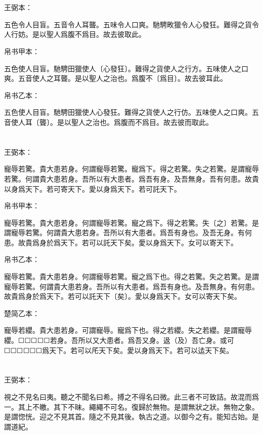 \documentclass[a5paper]{ctexbook}
\begin{document}
    \chapter{}
    王弼本：

    五色令人目盲。五音令人耳聾。五味令人口爽。馳騁畋獵令人心發狂。難得之貨令人行妨。是以聖人爲腹不爲目。故去彼取此。

    
    帛书甲本：

    五色使人目盲。馳騁田獵使人〔心發狂〕。難得之貨使人之行方。五味使人之口爽。五音使人之耳聾。是以聖人之治也。爲腹不〔爲目〕。故去彼耳此。

    帛书乙本：

    五色使人目盲。馳騁田獵使人心發狂。難得之貨使人之行仿。五味使人之口爽。五音使人耳〔聾〕。是以聖人之治也。爲腹而不爲目。故去彼而取此。

    \chapter{}
    王弼本：

    寵辱若驚。貴大患若身。何謂寵辱若驚。寵爲下。得之若驚。失之若驚。是謂寵辱若驚。何謂貴大患若身。吾所以有大患者。爲吾有身。及吾無身。吾有何患。故貴以身爲天下。若可寄天下。愛以身爲天下。若可託天下。

    
    帛书甲本：

    寵辱若驚。貴大患若身。何謂寵辱若驚。寵之爲下。得之若驚。失〔之〕若驚。是謂寵辱若驚。何謂貴大患若身。吾所以有大患者。爲吾有身也。及吾无身。有何患。故貴爲身於爲天下。若可以託天下矣。愛以身爲天下。女可以寄天下。

    帛书乙本：

    寵辱若驚。貴大患若身。何謂寵辱若驚。寵之爲下也。得之若驚。失之若驚。是謂寵辱若驚。何謂貴大患若身。吾所以有大患者。爲吾有身也。及吾無身。有何患。故貴爲身於爲天下。若可以託天下〔矣〕。愛以身爲天下。女可以寄天下矣。

    楚简乙本：

    寵辱若纓。貴大患若身。可謂寵辱。寵爲下也。得之若纓。失之若纓。是謂寵辱纓。☐☐☐☐☐若身。吾所以又大患者。爲吾又身。﨤（及）吾亡身。或可☐☐☐☐☐☐爲天下。若可以厇天下矣。愛以身爲天下。若可以迲天下矣。

    \chapter{}
    王弼本：

    視之不見名曰夷。聽之不聞名曰希。搏之不得名曰微。此三者不可致詰。故混而爲一。其上不皦。其下不昧。繩繩不可名。復歸於無物。是謂無狀之狀。無物之象。是謂惚恍。迎之不見其首。隨之不見其後。執古之道。以御今之有。能知古始。是謂道紀。
\end{document}
